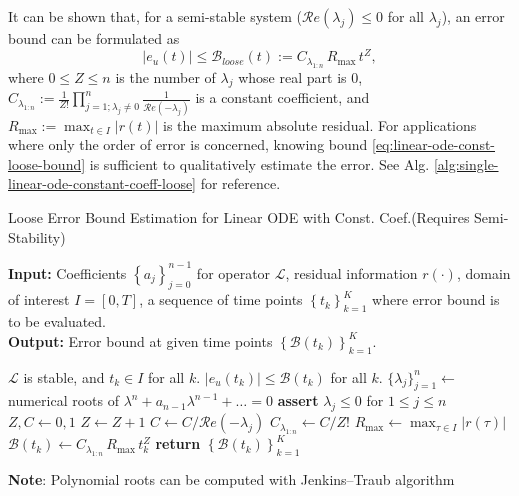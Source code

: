 \documentclass[accepted]{uai2023}
\newcommand{\Err}{e}
\newcommand{\Bound}{\mathcal{B}}
\renewcommand{\L}{\mathcal{L}}
\renewcommand{\Re}[1]{\mathcal{R}e\left(#1\right)}
\begin{document}
    It can be shown that, for a semi-stable system ($\Re{\lambda_j} \leq 0$ for all $\lambda_j$), an error bound can be formulated as
    \begin{equation} \label{eq:linear-ode-const-loose-bound}
        \left|\Err_u(t)\right| \leq \Bound_{loose}(t) := C_{\lambda_{1:n}}\, R_{\max}\, t^{Z},
    \end{equation}
    where $0\leq Z \leq n$ is the number of $\lambda_j$ whose real part is $0$, $C_{\lambda_{1:n}} := \frac{1}{Z!}\prod_{j=1; \lambda_j\neq 0}^{n} \frac{1}{\Re{-\lambda_j}}$ is a constant coefficient, and $R_{\max}:=\max_{t\in I} |r(t)|$ is the maximum absolute residual. 
    For applications where only the order of error is concerned, knowing bound \ref{eq:linear-ode-const-loose-bound} is sufficient to qualitatively estimate the error. See Alg. \ref{alg:single-linear-ode-constant-coeff-loose} for reference.

    \begin{algorithm}
        \small
        \caption{Loose Error Bound Estimation for Linear ODE with Const. Coef.\quad (Requires Semi-Stability)}\label{alg:single-linear-ode-constant-coeff-loose}
        \textbf{Input:} Coefficients $\left\{a_j\right\}_{j=0}^{n-1}$ for operator $\L$, residual information $r(\cdot)$, domain of interest $I = [0, T]$, a sequence of time points $\left\{t_k\right\}_{k=1}^{K}$ where error bound is to be evaluated.\\
        \textbf{Output:} Error bound at given time points $\left\{\Bound(t_k)\right\}_{k=1}^{K}$.

        \begin{algorithmic}
            \Require $\L$ is stable, and $t_k \in I$ for all $k$.
            \Ensure $\left|\Err_u(t_k)\right| \leq \Bound(t_k)$ for all $k$. 
            \vspace{0.5em}
            \State $\{\lambda_j\}_{j=1}^{n} \gets$ numerical roots of $\lambda^n+a_{n-1}\lambda^{n-1}+\dots=0$ 
            \State \textbf{assert} $\lambda_j \leq 0$ for $1 \leq j \leq n$ 
            \State $Z, C \gets 0, 1$
                \If{$\Re{\lambda_j} = 0$}
                    \State $Z \gets Z + 1$
                \Else
                    \State $C \gets C / \Re{-\lambda_j}$
                \EndIf
            \EndFor
            \State $C_{\lambda_{1:n}}\gets C / Z!$
            \State $R_{\max} \gets \max_{\tau \in I} |r(\tau)|$ 
                \State $\Bound(t_k) \gets C_{\lambda_{1:n}}\, R_{\max}\, t_k^{Z} $
            \EndFor
            \State \textbf{return} $\left\{\Bound(t_k)\right\}_{k=1}^{K}$
        \end{algorithmic}
        \vspace{0.5em} 
        \textbf{Note}: Polynomial roots can be computed with Jenkins–Traub algorithm \cite{jenkins1970three}
    \end{algorithm}
\end{document}
